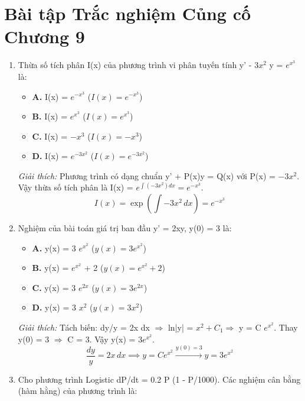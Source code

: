 \documentclass[11pt,a4paper,oneside]{book}
\begin{document}
\section{Bài tập Trắc nghiệm Củng cố Chương 9}
\begin{enumerate}[label=\textbf{Câu \arabic*:}, leftmargin=2.2em, itemsep=8pt]
  \item Thừa số tích phân I(x) của phương trình vi phân tuyến tính y' - $3x^2$ y = $e^{x^3}$ là:
  \begin{itemize}[label={}, leftmargin=1em, itemsep=2pt]
    \item \textbf{A.} I(x) = $e^{-x^3}$ \quad ($I(x) = e^{-x^3}$)
    \item \textbf{B.} I(x) = $e^{x^3}$ \quad ($I(x) = e^{x^3}$)
    \item \textbf{C.} I(x) = $-x^3$ \quad ($I(x) = -x^3$)
    \item \textbf{D.} I(x) = $e^{-3x^2}$ \quad ($I(x) = e^{-3x^2}$)
  \end{itemize}
  \vspace{2pt}
   \textit{Giải thích:} Phương trình có dạng chuẩn y' + P(x)y = Q(x) với P(x) = $-3x^2$. Vậy thừa số tích phân là I(x) = $e^{\int (-3x^2)dx} = e^{-x^3}$.
  \[ I(x) = \exp\left(\int -3x^2\,dx\right) = e^{-x^3} \]
  \item Nghiệm của bài toán giá trị ban đầu y' = 2xy, y(0) = 3 là:
  \begin{itemize}[label={}, leftmargin=1em, itemsep=2pt]
    \item \textbf{A.} y(x) = 3 $e^{x^2}$ \quad ($y(x) = 3e^{x^2}$)
    \item \textbf{B.} y(x) = $e^{x^2}$ + 2 \quad ($y(x) = e^{x^2} + 2$)
    \item \textbf{C.} y(x) = 3 $e^{2x}$ \quad ($y(x) = 3e^{2x}$)
    \item \textbf{D.} y(x) = 3 $x^2$ \quad ($y(x) = 3x^2$)
  \end{itemize}
  \vspace{2pt}
   \textit{Giải thích:} Tách biến: dy/y = 2x dx $\Rightarrow$  ln|y| = $x^2 + C_1 \Rightarrow$  y = C $e^{x^2}$. Thay y(0) = 3 $\Rightarrow$  C = 3. Vậy y(x) = $3e^{x^2}$.
  \[ \frac{dy}{y} = 2x\,dx \implies y = Ce^{x^2} \xrightarrow{y(0)=3} y = 3e^{x^2} \]
  \item Cho phương trình Logistic dP/dt = 0.2 P (1 - P/1000). Các nghiệm cân bằng (hàm hằng) của phương trình là:
  \begin{itemize}[label={}, leftmargin=1em, itemsep=2pt]

\end{itemize}
\end{enumerate}
\end{document}

